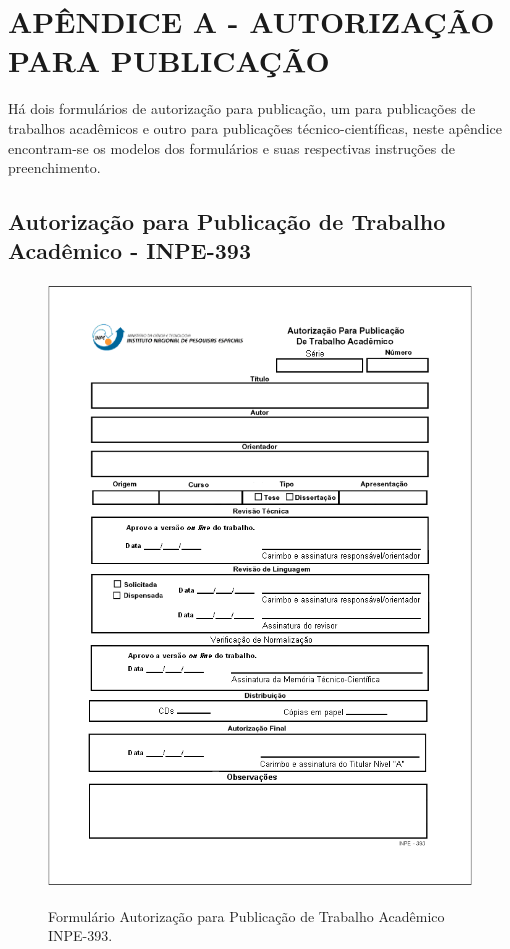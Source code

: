 \hypertarget{estilo:apendice1}{} %
\renewcommand{\thechapter}{}%
\chapter{APÊNDICE A - AUTORIZAÇÃO PARA PUBLICAÇÃO}	%
\label{apendiceA}	%
\renewcommand{\thechapter}{A}%

Há dois formulários de autorização para publicação, um para publicações de trabalhos acadêmicos e outro para publicações técnico-científicas, neste apêndice encontram-se os modelos dos formulários e suas respectivas instruções de preenchimento. 

\section{Autorização para Publicação de Trabalho Acadêmico - INPE-393}

\label{instr393}

	\begin{figure}[ht]
		\caption{Formulário Autorização para Publicação de Trabalho Acadêmico INPE-393.}
		\vspace{6mm}	%
		\centering
   		\includegraphics[height=16cm]{./docs/figs/form393.png}	   
 		\label{form393}
	\end{figure}


